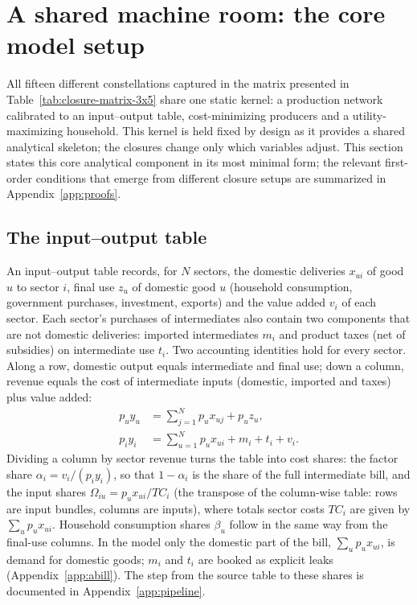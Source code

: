\section{A shared machine room: the core model setup}\label{sec:kernel}

All fifteen different constellations captured in the matrix presented in Table~\ref{tab:closure-matrix-3x5} share one static kernel: a production
network calibrated to an input--output table, cost-minimizing producers and
a utility-maximizing household. This kernel is held fixed by design as it provides a shared analytical skeleton; the closures change only which variables adjust. This section states this core analytical component in its most minimal form; the relevant first-order conditions that emerge from different closure setups are summarized in Appendix~\ref{app:proofs}.

\renewcommand*{\theHequation}{kernel.\arabic{equation}}

\subsection{The input--output table}\label{subsec:io-table}
An input--output table records, for $N$ sectors, the domestic deliveries
$x_{ui}$ of good $u$ to sector $i$, final use $z_u$ of domestic good $u$
(household consumption, government purchases, investment, exports) and the
value added $v_i$ of each sector. Each sector's purchases of intermediates
also contain two components that are not domestic deliveries: imported
intermediates $m_i$ and product taxes (net of subsidies) on intermediate
use $t_i$. Two accounting identities hold for every sector. Along a row,
domestic output equals intermediate and final use; down a column, revenue
equals the cost of intermediate inputs (domestic, imported and taxes) plus
value added:
\begin{align}
p_u y_u &= \sum_{j=1}^N p_u x_{uj} + p_u z_u,
\label{eq:io-row}\\
p_i y_i &= \sum_{u=1}^N p_u x_{ui} + m_i + t_i + v_i.
\label{eq:io-column}
\end{align}
Dividing a column by sector revenue turns the table into cost shares: the
factor share $\alpha_i = v_i/(p_i y_i)$, so that $1-\alpha_i$ is the share
of the full intermediate bill, and the input shares $\Omega_{iu} = p_u x_{ui}/TC_i$ (the transpose of the
column-wise table: rows are input bundles, columns are inputs), where totals
sector costs $TC_i$ are given by $\sum_{u} p_{u}x_{ui}$. Household consumption shares $\beta_u$ follow in the same way from the final-use columns. In the model only the domestic part of the bill, $\sum_u p_u x_{ui}$, is demand
for domestic goods; $m_i$ and $t_i$ are booked as explicit leaks (Appendix~\ref{app:abill}). The step from the source table to these shares is documented in Appendix~\ref{app:pipeline}.

